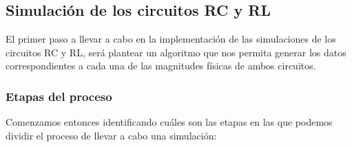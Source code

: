 \documentclass[../main.tex]{subfiles}
\begin{document}
\subsection{Simulación de los circuitos RC y RL}
El primer paso a llevar a cabo en la implementación de las simulaciones de los circuitos RC y RL, será plantear un algoritmo que nos permita generar los datos correspondientes a cada una de las magnitudes físicas de ambos circuitos.\\ 

\subsubsection{Etapas del proceso}
Comenzamos entonces identificando cuáles son las etapas en las que podemos dividir el proceso de llevar a cabo una simulación:
\end{document}

